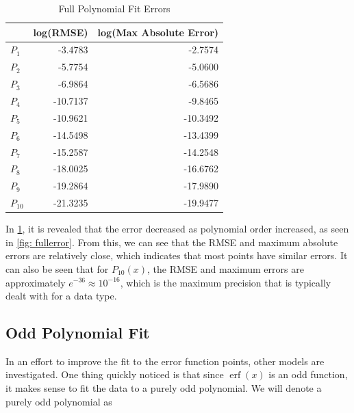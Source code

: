 \documentclass[10pt,a4paper]{article}
\DeclareMathOperator\erf{erf}
\begin{document}
\begin{table}[H]
\centering
\begin{tabular}{l|rr}
\multicolumn{1}{l|}{} & \multicolumn{1}{c}{log(RMSE)} & \multicolumn{1}{c}{log(Max Absolute Error)} \\ \hline
$P_1$                  & -3.4783                     & -2.7574                                  \\
$P_2$                  & -5.7754                     & -5.0600                                   \\
$P_3$                  & -6.9864                     & -6.5686                                   \\
$P_4$                  & -10.7137                    & -9.8465                                    \\
$P_5$                  & -10.9621                    & -10.3492                                  \\
$P_6$                  & -14.5498                    & -13.4399                                  \\
$P_7$                  & -15.2587                    & -14.2548                                 \\
$P_8$                  & -18.0025                    & -16.6762                                \\
$P_9$                  & -19.2864                    & -17.9890                                 \\
$P_{10}$                 & -21.3235                    & -19.9477                                
\end{tabular}
\caption{Full Polynomial Fit Errors}
\label{table: fullerrors}
\end{table}

In \cref{table: fullerrors}, it is revealed that the error decreased as polynomial order increased, as seen in \cref{fig: fullerror}. From this, we can see that the RMSE and maximum absolute errors are relatively close, which indicates that most points have similar errors. It can also be seen that for $P_{10}(x)$, the RMSE and maximum errors are approximately $e^{-36} \approx 10^{-16}$, which is the maximum precision that is typically dealt with for a data type.

\subsection*{Odd Polynomial Fit}

In an effort to improve the fit to the error function points, other models are investigated. One thing quickly noticed is that since $\erf{(x)}$ is an odd function, it makes sense to fit the data to a purely odd polynomial. We will denote a purely odd polynomial as
\end{document}
